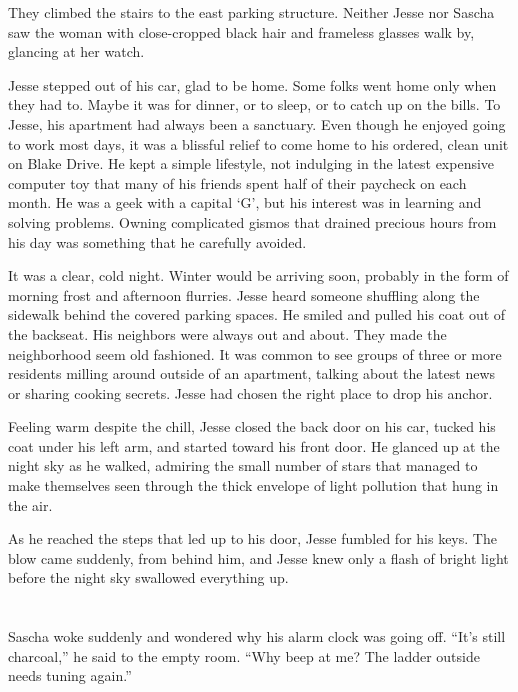 \documentclass[12pt]{book}
\begin{document}
They climbed the stairs to the east parking structure.  Neither Jesse nor Sascha saw the woman with close-cropped black hair and frameless glasses walk by, glancing at her watch.


Jesse stepped out of his car, glad to be home.  Some folks went home only when they had to.  Maybe it was for dinner, or to sleep, or to catch up on the bills.  To Jesse, his apartment had always been a sanctuary.  Even though he enjoyed going to work most days, it was a blissful relief to come home to his ordered, clean unit on Blake Drive.  He kept a simple lifestyle, not indulging in the latest expensive computer toy that many of his friends spent half of their paycheck on each month.  He was a geek with a capital `G', but his interest was in learning and solving problems.  Owning complicated gismos that drained precious hours from his day was something that he carefully avoided.

It was a clear, cold night.  Winter would be arriving soon, probably in the form of morning frost and afternoon flurries.  Jesse heard someone shuffling along the sidewalk behind the covered parking spaces.  He smiled and pulled his coat out of the backseat.  His neighbors were always out and about.  They made the neighborhood seem old fashioned.  It was common to see groups of three or more residents milling around outside of an apartment, talking about the latest news or sharing cooking secrets.  Jesse had chosen the right place to drop his anchor.

Feeling warm despite the chill, Jesse closed the back door on his car, tucked his coat under his left arm, and started toward his front door.  He glanced up at the night sky as he walked, admiring the small number of stars that managed to make themselves seen through the thick envelope of light pollution that hung in the air.

As he reached the steps that led up to his door, Jesse fumbled for his keys.  The blow came suddenly, from behind him, and Jesse knew only a flash of bright light before the night sky swallowed everything up.

\chapter{}

Sascha woke suddenly and wondered why his alarm clock was going off.  ``It's still charcoal,'' he said to the empty room.  ``Why beep at me?  The ladder outside needs tuning again.''
\end{document}
